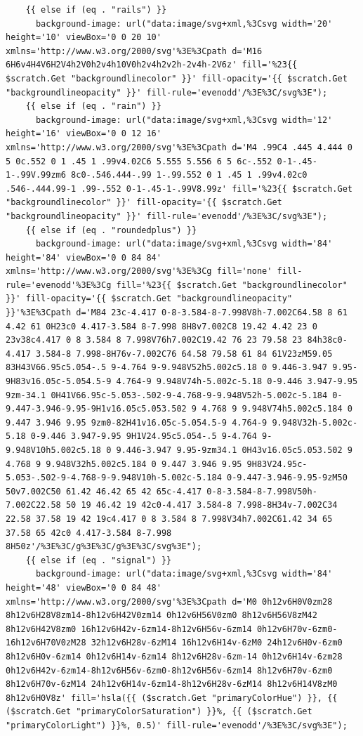 \documentclass[11pt]{article}
\begin{document}
\begin{enumerate}
\begin{verbatim}
    {{ else if (eq . "rails") }}
      background-image: url("data:image/svg+xml,%3Csvg width='20' height='10' viewBox='0 0 20 10' xmlns='http://www.w3.org/2000/svg'%3E%3Cpath d='M16 6H6v4H4V6H2V4h2V0h2v4h10V0h2v4h2v2h-2v4h-2V6z' fill='%23{{ $scratch.Get "backgroundlinecolor" }}' fill-opacity='{{ $scratch.Get "backgroundlineopacity" }}' fill-rule='evenodd'/%3E%3C/svg%3E");
    {{ else if (eq . "rain") }}
      background-image: url("data:image/svg+xml,%3Csvg width='12' height='16' viewBox='0 0 12 16' xmlns='http://www.w3.org/2000/svg'%3E%3Cpath d='M4 .99C4 .445 4.444 0 5 0c.552 0 1 .45 1 .99v4.02C6 5.555 5.556 6 5 6c-.552 0-1-.45-1-.99V.99zm6 8c0-.546.444-.99 1-.99.552 0 1 .45 1 .99v4.02c0 .546-.444.99-1 .99-.552 0-1-.45-1-.99V8.99z' fill='%23{{ $scratch.Get "backgroundlinecolor" }}' fill-opacity='{{ $scratch.Get "backgroundlineopacity" }}' fill-rule='evenodd'/%3E%3C/svg%3E");
    {{ else if (eq . "roundedplus") }}
      background-image: url("data:image/svg+xml,%3Csvg width='84' height='84' viewBox='0 0 84 84' xmlns='http://www.w3.org/2000/svg'%3E%3Cg fill='none' fill-rule='evenodd'%3E%3Cg fill='%23{{ $scratch.Get "backgroundlinecolor" }}' fill-opacity='{{ $scratch.Get "backgroundlineopacity" }}'%3E%3Cpath d='M84 23c-4.417 0-8-3.584-8-7.998V8h-7.002C64.58 8 61 4.42 61 0H23c0 4.417-3.584 8-7.998 8H8v7.002C8 19.42 4.42 23 0 23v38c4.417 0 8 3.584 8 7.998V76h7.002C19.42 76 23 79.58 23 84h38c0-4.417 3.584-8 7.998-8H76v-7.002C76 64.58 79.58 61 84 61V23zM59.05 83H43V66.95c5.054-.5 9-4.764 9-9.948V52h5.002c5.18 0 9.446-3.947 9.95-9H83v16.05c-5.054.5-9 4.764-9 9.948V74h-5.002c-5.18 0-9.446 3.947-9.95 9zm-34.1 0H41V66.95c-5.053-.502-9-4.768-9-9.948V52h-5.002c-5.184 0-9.447-3.946-9.95-9H1v16.05c5.053.502 9 4.768 9 9.948V74h5.002c5.184 0 9.447 3.946 9.95 9zm0-82H41v16.05c-5.054.5-9 4.764-9 9.948V32h-5.002c-5.18 0-9.446 3.947-9.95 9H1V24.95c5.054-.5 9-4.764 9-9.948V10h5.002c5.18 0 9.446-3.947 9.95-9zm34.1 0H43v16.05c5.053.502 9 4.768 9 9.948V32h5.002c5.184 0 9.447 3.946 9.95 9H83V24.95c-5.053-.502-9-4.768-9-9.948V10h-5.002c-5.184 0-9.447-3.946-9.95-9zM50 50v7.002C50 61.42 46.42 65 42 65c-4.417 0-8-3.584-8-7.998V50h-7.002C22.58 50 19 46.42 19 42c0-4.417 3.584-8 7.998-8H34v-7.002C34 22.58 37.58 19 42 19c4.417 0 8 3.584 8 7.998V34h7.002C61.42 34 65 37.58 65 42c0 4.417-3.584 8-7.998 8H50z'/%3E%3C/g%3E%3C/g%3E%3C/svg%3E");
    {{ else if (eq . "signal") }}
      background-image: url("data:image/svg+xml,%3Csvg width='84' height='48' viewBox='0 0 84 48' xmlns='http://www.w3.org/2000/svg'%3E%3Cpath d='M0 0h12v6H0V0zm28 8h12v6H28V8zm14-8h12v6H42V0zm14 0h12v6H56V0zm0 8h12v6H56V8zM42 8h12v6H42V8zm0 16h12v6H42v-6zm14-8h12v6H56v-6zm14 0h12v6H70v-6zm0-16h12v6H70V0zM28 32h12v6H28v-6zM14 16h12v6H14v-6zM0 24h12v6H0v-6zm0 8h12v6H0v-6zm14 0h12v6H14v-6zm14 8h12v6H28v-6zm-14 0h12v6H14v-6zm28 0h12v6H42v-6zm14-8h12v6H56v-6zm0-8h12v6H56v-6zm14 8h12v6H70v-6zm0 8h12v6H70v-6zM14 24h12v6H14v-6zm14-8h12v6H28v-6zM14 8h12v6H14V8zM0 8h12v6H0V8z' fill='hsla({{ ($scratch.Get "primaryColorHue") }}, {{ ($scratch.Get "primaryColorSaturation") }}%, {{ ($scratch.Get "primaryColorLight") }}%, 0.5)' fill-rule='evenodd'/%3E%3C/svg%3E");

\end{verbatim}
\end{enumerate}
\end{document}
